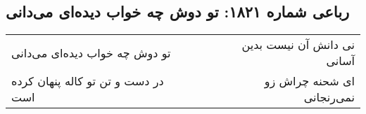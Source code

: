 \begin{center}
\section*{رباعی شماره ۱۸۲۱: تو دوش چه خواب دیده‌ای می‌دانی}
\label{sec:1821}
\begin{longtable}{l p{0.5cm} r}
تو دوش چه خواب دیده‌ای می‌دانی
&&
نی دانش آن نیست بدین آسانی
\\
در دست و تن تو کاله پنهان کرده است
&&
ای شحنه چراش زو نمی‌رنجانی
\\
\end{longtable}
\end{center}
